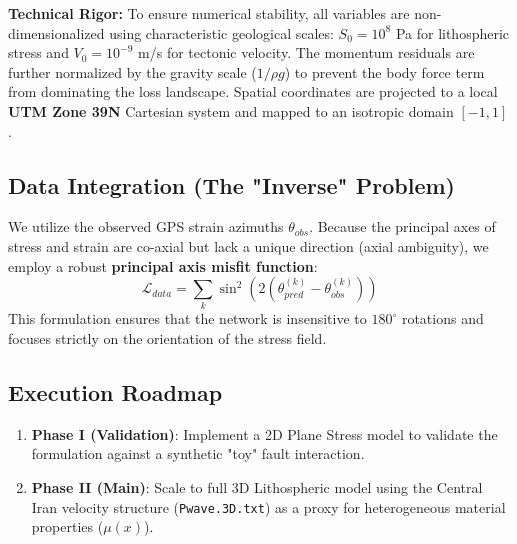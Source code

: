 \documentclass[11pt, a4paper]{article}
\begin{document}
\textbf{Technical Rigor:} To ensure numerical stability, all variables are non-dimensionalized using characteristic geological scales: $S_0 = 10^8$ Pa for lithospheric stress and $V_0 = 10^{-9}$ m/s for tectonic velocity. The momentum residuals are further normalized by the gravity scale ($1/\rho g$) to prevent the body force term from dominating the loss landscape. Spatial coordinates are projected to a local \textbf{UTM Zone 39N} Cartesian system and mapped to an isotropic domain $[-1, 1]$.

\subsection{Data Integration (The "Inverse" Problem)}
We utilize the observed GPS strain azimuths $\theta_{obs}$. Because the principal axes of stress and strain are co-axial but lack a unique direction (axial ambiguity), we employ a robust \textbf{principal axis misfit function}:
\begin{equation}
    \mathcal{L}_{data} = \sum_{k} \sin^2(2(\theta_{pred}^{(k)} - \theta_{obs}^{(k)}))
\end{equation}
This formulation ensures that the network is insensitive to $180^\circ$ rotations and focuses strictly on the orientation of the stress field.

\subsection{Execution Roadmap}
\begin{enumerate}
    \item \textbf{Phase I (Validation)}: Implement a 2D Plane Stress model to validate the formulation against a synthetic "toy" fault interaction.
    \item \textbf{Phase II (Main)}: Scale to full 3D Lithospheric model using the Central Iran velocity structure (\texttt{Pwave.3D.txt}) as a proxy for heterogeneous material properties ($\mu(x)$).
\end{enumerate}
\end{document}

